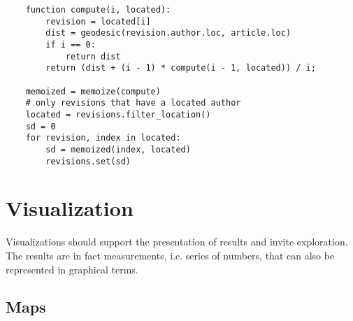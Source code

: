 \begin{lstlisting}
	function compute(i, located):
		revision = located[i]
		dist = geodesic(revision.author.loc, article.loc)
		if i == 0:
			return dist
		return (dist + (i - 1) * compute(i - 1, located)) / i;
		
	memoized = memoize(compute)
	# only revisions that have a located author
	located = revisions.filter_location() 
	sd = 0
	for revision, index in located:
		sd = memoized(index, located)
		revisions.set(sd)
\end{lstlisting}

\section{Visualization}\label{sec:visualization}

Visualizations should support the presentation of results and invite exploration.
The results are in fact measurements, i.e. series of numbers, that can also be represented in graphical terms.


\subsection{Maps}

